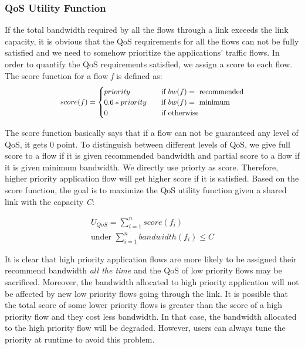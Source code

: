 \subsubsection{QoS Utility Function}
\label{sect:qosUF}
If the total bandwidth required by all the flows through a link exceeds the link capacity, it is obvious that the QoS requirements for
all the flows can not be fully satisfied and we need to somehow prioritize the applications' traffic flows. In order to quantify the QoS
requirements satisfied, we assign a score to each flow. The score function for a flow \emph{f} is defined as:
\begin{equation}
\scalebox{0.9}{
  $score(f) =
    \begin{cases}
      priority       & \quad \text{if } bw(f) = \text{ recommended}\\
      0.6 * priority & \quad \text{if } bw(f) = \text{ minimum}\\
      0              & \quad \text{if } \text{otherwise}\\
    \end{cases}$
}
\end{equation}

The score function basically says that if a flow can not be guaranteed any level of QoS, it gets 0 point. To distinguish between different
levels of QoS, we give full score to a flow if it is given recommended bandwidth and partial score to a flow if it is given minimum bandwidth.
We directly use priorty as score. Therefore, higher priority application flow will get higher score if it is satisfied. Based on the score
function, the goal is to maximize the QoS utility function given a shared link with the capacity \emph{C}:

\begin{equation}
\begin{split}
  U_{QoS} = \sum_{i=1}^{n} score(f_i) \\ 
  \text{under } \sum_{i=1}^{n} bandwidth(f_i) \leq C
\end{split}
\end{equation}

It is clear that high priority application flows are more likely to be assigned their recommend bandwidth \emph{all the time} and the QoS of low
priority flows may be sacrificed. Moreover, the bandwidth allocated to high priority application will not be affected by new low priority flows
going through the link. It is possible that the total score of some lower priority flows is greater than the score of a high priority flow and
they cost less bandwidth. In that case, the bandwidth allocated to the high priority flow will be degraded. However, users can always tune the
priority at runtime to avoid this problem.

